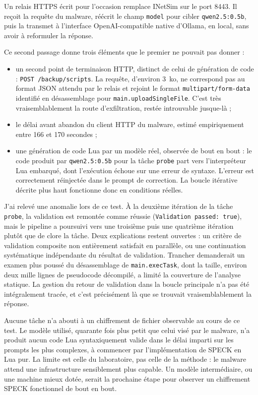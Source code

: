 Un relais HTTPS écrit pour l'occasion remplace INetSim sur le port 8443. Il reçoit la requête du malware, réécrit le champ \texttt{model} pour cibler \texttt{qwen2.5:0.5b}, puis la transmet à l'interface OpenAI-compatible native d'Ollama, en local, sans avoir à reformuler la réponse.

Ce second passage donne trois éléments que le premier ne pouvait pas donner :

\begin{itemize}
    \item un second point de terminaison HTTP, distinct de celui de génération de code : \texttt{POST /backup/scripts}. La requête, d'environ 3~ko, ne correspond pas au format JSON attendu par le relais et rejoint le format \texttt{multipart/form-data} identifié en désassemblage pour \texttt{main.uploadSingleFile}. C'est très vraisemblablement la route d'exfiltration, restée introuvable jusque-là ;
    \item le délai avant abandon du client HTTP du malware, estimé empiriquement entre 166 et 170 secondes ;
    \item une génération de code Lua par un modèle réel, observée de bout en bout : le code produit par \texttt{qwen2.5:0.5b} pour la tâche \texttt{probe} part vers l'interpréteur Lua embarqué, dont l'exécution échoue sur une erreur de syntaxe. L'erreur est correctement réinjectée dans le prompt de correction. La boucle itérative décrite plus haut fonctionne donc en conditions réelles.
\end{itemize}

J'ai relevé une anomalie lors de ce test. À la deuxième itération de la tâche \texttt{probe}, la validation est remontée comme réussie (\texttt{Validation passed: true}), mais le pipeline a poursuivi vers une troisième puis une quatrième itération plutôt que de clore la tâche. Deux explications restent ouvertes : un critère de validation composite non entièrement satisfait en parallèle, ou une continuation systématique indépendante du résultat de validation. Trancher demanderait un examen plus poussé du désassemblage de \texttt{main.execTask}, dont la taille, environ deux mille lignes de pseudocode décompilé, a limité la couverture de l'analyse statique. La gestion du retour de validation dans la boucle principale n'a pas été intégralement tracée, et c'est précisément là que se trouvait vraisemblablement la réponse.

Aucune tâche n'a abouti à un chiffrement de fichier observable au cours de ce test. Le modèle utilisé, quarante fois plus petit que celui visé par le malware, n'a produit aucun code Lua syntaxiquement valide dans le délai imparti sur les prompts les plus complexes, à commencer par l'implémentation de SPECK en Lua pur. La limite est celle du laboratoire, pas celle de la méthode : le malware attend une infrastructure sensiblement plus capable. Un modèle intermédiaire, ou une machine mieux dotée, serait la prochaine étape pour observer un chiffrement SPECK fonctionnel de bout en bout.

